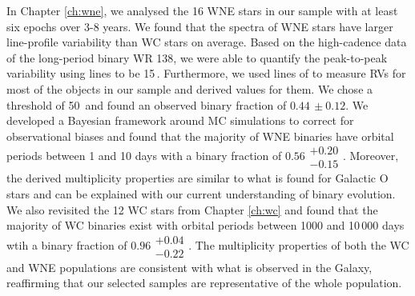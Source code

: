 In Chapter \ref{ch:wne}, we analysed the 16 WNE stars in our sample with at least six epochs over 3-8 years. We found that the spectra of WNE stars have larger line-profile variability than WC stars on average. Based on the high-cadence data of the long-period binary WR 138, we were able to quantify the peak-to-peak variability using \nv{} lines to be 15\,\kms{}. Furthermore, we used lines of \nv{} to measure RVs for most of the objects in our sample and derived \DelRV{} values for them. We chose a threshold of 50\,\kms{} and found an observed binary fraction of $0.44\,\pm0.12$. We developed a Bayesian framework around MC simulations to correct for observational biases and found that the majority of WNE binaries have orbital periods between 1 and 10 days with a binary fraction of $0.56\substack{+0.20 \\ -0.15}$. Moreover, the derived multiplicity properties are similar to what is found for Galactic O stars and can be explained with our current understanding of binary evolution. We also revisited the 12 WC stars from Chapter \ref{ch:wc} and found that the majority of WC binaries exist with orbital periods between 1000 and 10\,000 days wtih a binary fraction of $0.96\substack{+0.04 \\ -0.22}$. The multiplicity properties of both the WC and WNE populations are consistent with what is observed in the Galaxy, reaffirming that our selected samples are representative of the whole population. 


